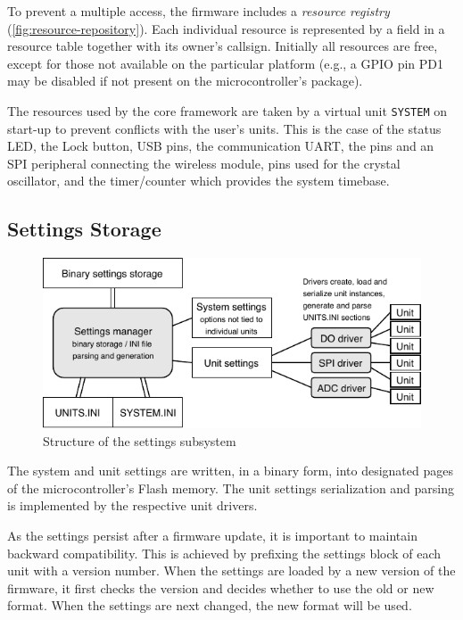 To prevent a multiple access, the firmware includes a \textit{resource registry} (\cref{fig:resource-repository}). Each individual resource is represented by a field in a resource table together with its owner's callsign. Initially all resources are free, except for those not available on the particular platform (e.g., a \gls{GPIO} pin PD1 may be disabled if not present on the microcontroller's package).

The resources used by the core framework are taken by a virtual unit \verb|SYSTEM| on start-up to prevent conflicts with the user's units. This is the case of the status \gls{LED}, the Lock button, \gls{USB} pins, the communication \gls{UART}, the pins and an \gls{SPI} peripheral connecting the wireless module, pins used for the crystal oscillator, and the timer/counter which provides the system timebase.


\subsection{Settings Storage} \label{sec:settings-storage}

\begin{figure}[h]
	\centering
	\includegraphics[scale=1] {img/settings-storage.pdf}
	\caption{\label{fig:settings-storage}Structure of the settings subsystem}
\end{figure}

The system and unit settings are written, in a binary form, into designated pages of the microcontroller's Flash memory. The unit settings serialization and parsing is implemented by the respective unit drivers.

As the settings persist after a firmware update, it is important to maintain backward compatibility. This is achieved by prefixing the settings block of each unit with a version number. When the settings are loaded by a new version of the firmware, it first checks the version and decides whether to use the old or new format. When the settings are next changed, the new format will be used.

